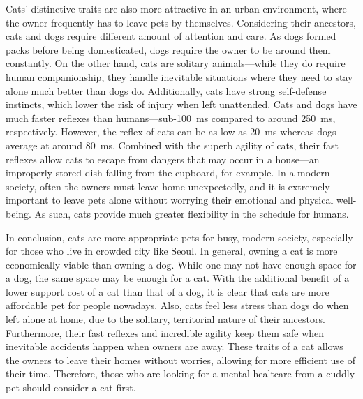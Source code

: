 \documentclass{mla}
\begin{document}
Cats' distinctive traits are also more attractive in an urban environment, where the owner frequently has to leave pets by themselves.
Considering their ancestors, cats and dogs require different amount of attention and care.
As dogs formed packs before being domesticated, dogs require the owner to be around them constantly.
On the other hand, cats are solitary animals---while they do require human companionship, they handle inevitable situations where they need to stay alone much better than dogs do.
Additionally, cats have strong self-defense instincts, which lower the risk of injury when left unattended.
Cats and dogs have much faster reflexes than humans---sub-\SI{100}{\ms} compared to around \SI{250}{\ms}, respectively.
However, the reflex of cats can be as low as \SI{20}{\ms} whereas dogs average at around \SI{80}{\ms}.
Combined with the superb agility of cats, their fast reflexes allow cats to escape from dangers that may occur in a house---an improperly stored dish falling from the cupboard, for example.
In a modern society, often the owners must leave home unexpectedly, and it is extremely important to leave pets alone without worrying their emotional and physical well-being.
As such, cats provide much greater flexibility in the schedule for humans.

In conclusion, cats are more appropriate pets for busy, modern society, especially for those who live in crowded city like Seoul.
In general, owning a cat is more economically viable than owning a dog.
While one may not have enough space for a dog, the same space may be enough for a cat.
With the additional benefit of a lower support cost of a cat than that of a dog, it is clear that cats are more affordable pet for people nowadays.
Also, cats feel less stress than dogs do when left alone at home, due to the solitary, territorial nature of their ancestors.
Furthermore, their fast reflexes and incredible agility keep them safe when inevitable accidents happen when owners are away.
These traits of a cat allows the owners to leave their homes without worries, allowing for more efficient use of their time.
Therefore, those who are looking for a mental healtcare from a cuddly pet should consider a cat first.
\end{document}
